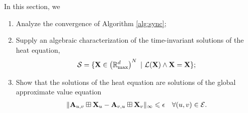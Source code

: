 \documentclass[letterpaper, 10 pt, conference]{ieeeconf}
\begin{document}
\noindent In this section, we
\begin{enumerate}
    \item Analyze the convergence of Algorithm \ref{alg:sync}; \\
    \item Supply an algebraic characterization of the time-invariant solutions of the heat equation,
        \begin{align}
            \mathcal{S} = \{ \mathbf{X} \in \left(\mathbb{R}_{\mathrm{max}}^{d}\right)^N~\vert~\mathcal{L}(\mathbf{X}) \wedge \mathbf{X} = \mathbf{X} \};\label{eq:solutions}
        \end{align}
    \item Show that the solutions of the heat equation are solutions of the global approximate value equation
\begin{align}
\| \mathbf{A}_{u,v} \boxplus \mathbf{X}_{u} - \mathbf{A}_{v,u} \boxplus \mathbf{X}_v \|_{\infty} \leqslant \epsilon \quad \forall (u,v) \in \mathcal{E}. \label{eq:equilibrium-global}
\end{align}
\end{enumerate}

\end{document}
